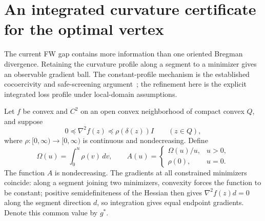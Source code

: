 \section{An integrated curvature certificate for the optimal vertex}
\label{sec:vertex}
The current FW gap contains more information than one oriented Bregman
divergence. Retaining the curvature profile along a segment to a
minimizer gives an observable gradient ball. The constant-profile
mechanism is the established cocoercivity and safe-screening
argument~\cite{wachsmuth,raj,sunbach};
the refinement here is the explicit integrated loss profile under
local-domain assumptions.

Let $f$ be convex and $C^2$ on an open convex neighborhood of compact
convex $Q$, and suppose
\begin{equation}\label{vertex:profile}
 0\preceq\nabla^2 f(z)\preceq\rho(\delta(z))I\qquad(z\in Q),
\end{equation}
where $\rho:[0,\infty)\to[0,\infty)$ is continuous and
nondecreasing. Define
\begin{equation}\label{vertex:profiledefs}
 \Omega(u)=\int_0^u\rho(v)\,dv,\qquad
 A(u)=\begin{cases}\Omega(u)/u,&u>0,\\ \rho(0),&u=0.\end{cases}
\end{equation}
The function $A$ is nondecreasing. The gradients at all constrained
minimizers coincide: along a segment joining two minimizers, convexity
forces the function to be constant; positive semidefiniteness of the
Hessian then gives $\nabla^2 f(z)d=0$ along the segment direction $d$,
so integration gives equal endpoint gradients. Denote this common value
by $g^*$.

